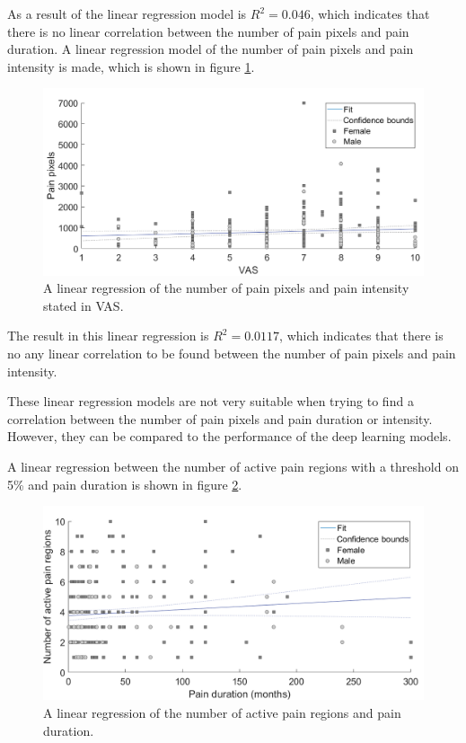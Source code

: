 \noindent
As a result of the linear regression model is $R^2=0.046$, which indicates that there is no linear correlation between the number of pain pixels and pain duration.\newline
\noindent
A linear regression model of the number of pain pixels and pain intensity is made, which is shown in figure \ref{fig:painRegression}. \newline

\begin{figure} [H]
\centering
\includegraphics[width=1\textwidth]{figures/vaspixel}
\caption{A linear regression of the number of pain pixels and pain intensity stated in VAS.}
\label{fig:painRegression}
\end{figure}

\noindent
The result in this linear regression is $R^2=0.0117$, which indicates that there is no any linear correlation to be found between the number of pain pixels and pain intensity.\newline

\noindent
These linear regression models are not very suitable when trying to find a correlation between the number of pain pixels and pain duration or intensity. However, they can be compared to the performance of the deep learning models.


\noindent
A linear regression between the number of active pain regions with a threshold on 5\% and pain duration is shown in figure \ref{fig:regDuration}. \newline

\begin{figure} [H]
\centering
\includegraphics[width=1\textwidth]{figures/duraregion}
\caption{A linear regression of the number of active pain regions and pain duration.}
\label{fig:regDuration}
\end{figure}

